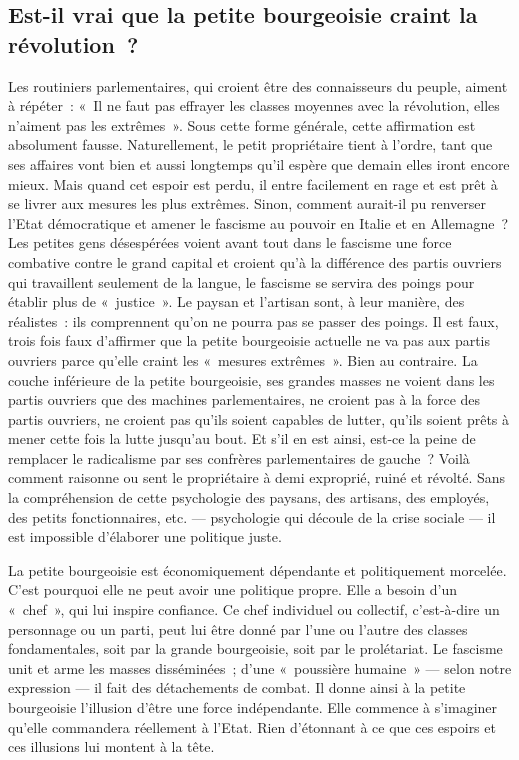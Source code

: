 \documentclass[french,twoside]{book} %
\begin{document}
\subsection[{Est-il vrai que la petite bourgeoisie craint la révolution ?}]{Est-il vrai que la petite bourgeoisie craint la révolution ?}
\noindent Les routiniers parlementaires, qui croient être des connaisseurs du peuple, aiment à répéter : « Il ne faut pas effrayer les classes moyennes avec la révolution, elles n’aiment pas les extrêmes ». Sous cette forme générale, cette affirmation est absolument fausse. Naturellement, le petit propriétaire tient à l’ordre, tant que ses affaires vont bien et aussi longtemps qu’il espère que demain elles iront encore mieux. Mais quand cet espoir est perdu, il entre facilement en rage et est prêt à se livrer aux mesures les plus extrêmes. Sinon, comment aurait-il pu renverser l’Etat démocratique et amener le fascisme au  pouvoir en Italie et en Allemagne ? Les petites gens désespérées voient avant tout dans le fascisme une force combative contre le grand capital et croient qu’à la différence des partis ouvriers qui travaillent seulement de la langue, le fascisme se servira des poings pour établir plus de « justice ». Le paysan et l’artisan sont, à leur manière, des réalistes : ils comprennent qu’on ne pourra pas se passer des poings. Il est faux, trois fois faux d’affirmer que la petite bourgeoisie actuelle ne va pas aux partis ouvriers parce qu’elle craint les « mesures extrêmes ». Bien au contraire. La couche inférieure de la petite bourgeoisie, ses grandes masses ne voient dans les partis ouvriers que des machines parlementaires, ne croient pas à la force des partis ouvriers, ne croient pas qu’ils soient capables de lutter, qu’ils soient prêts à mener cette fois la lutte jusqu’au bout. Et s’il en est ainsi, est-ce la peine de remplacer le radicalisme par ses confrères parlementaires de gauche ? Voilà comment raisonne ou sent le propriétaire à demi exproprié, ruiné et révolté. Sans la compréhension de cette psychologie des paysans, des artisans, des employés, des petits fonctionnaires, etc. — psychologie qui découle de la crise sociale — il est impossible d’élaborer une politique juste.\par
La petite bourgeoisie est économiquement dépendante et politiquement morcelée. C’est pourquoi elle ne peut avoir une politique propre. Elle a besoin d’un « chef », qui lui inspire confiance. Ce chef individuel ou collectif, c’est-à-dire un personnage ou un parti, peut lui être donné par l’une ou l’autre des classes fondamentales, soit par la grande bourgeoisie, soit par le prolétariat. Le fascisme unit et arme les masses disséminées ; d’une « poussière humaine » — selon notre expression — il fait des détachements de combat. Il donne ainsi à la petite bourgeoisie l’illusion d’être une force indépendante. Elle commence à s’imaginer qu’elle commandera réellement à  l’Etat. Rien d’étonnant à ce que ces espoirs et ces illusions lui montent à la tête.\par
\end{document}
